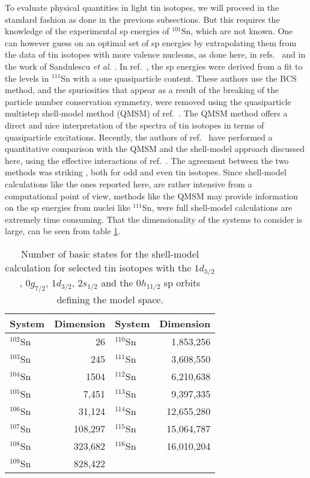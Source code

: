 To evaluate physical quantities in light tin isotopes, we will
proceed in the standard fashion as done in the previous
subsections. But this requires the knowledge of the
experimental sp energies of $^{101}$Sn, which are not known.
One can however guess on an optimal set of sp energies by
extrapolating them from the data of tin isotopes with more
valence nucleons, as done here, in refs.\ \cite{ehho93,holt94,physcripta94}
and in the work of
Sandulescu {\em et al.} \cite{nicu93,nicu94}.
In ref.\
\cite{nicu94},
the sp energies were derived from a fit to the levels in
$^{111}$Sn with a one quasiparticle content. These authors
use the BCS method, and the spuriosities that appear as a
result of the breaking of the particle number conservation symmetry,
were removed using the quasiparticle multistep shell-model method
(QMSM) of ref.\ \cite{pomar92}. The QMSM method offers a direct
and nice interpretation of the spectra of
tin isotopes in terms of quasiparticle excitations. Recently, 
the authors of ref.\ \cite{nicuoslo94}
have performed a quantitative comparison with the
QMSM and the shell-model approach discussed here, using the effective
interactions of ref.\ \cite{ehho93}. 
The agreement between the two methods was striking
\cite{nicuoslo94}, both for odd and even tin isotopes.
Since shell-model calculations like the ones reported here, are
rather intensive from a computational point of view,
methods like the QMSM may provide information on the sp energies
from nuclei like $^{111}$Sn, were full shell-model
calculations are extremely time consuming. That the dimensionality
of the systems to consider is large, can be seen from table
\ref{tab:tindim}.
\begin{table}
\label{tab:tindim}
\begin{center}
\caption{Number of basic states for the shell-model calculation
for selected tin isotopes with the 
$1d_{5/2}$, $0g_{7/2}$, $1d_{3/2}$, $2s_{1/2}$
and the $0h_{11/2}$ sp orbits defining the model space.}
\begin{tabular}{lr lr}\\ \hline
System & Dimension & System & Dimension\\ \hline
$^{102}$Sn  & 26&  $^{110}$Sn  & 1,853,256\\
$^{103}$Sn  & 245&  $^{111}$Sn  & 3,608,550\\
$^{104}$Sn  & 1504&  $^{112}$Sn  & 6,210,638\\
$^{105}$Sn  & 7,451&  $^{113}$Sn  & 9,397,335\\
$^{106}$Sn  & 31,124&  $^{114}$Sn  & 12,655,280\\
$^{107}$Sn  & 108,297&  $^{115}$Sn  & 15,064,787\\
$^{108}$Sn  & 323,682&  $^{116}$Sn  & 16,010,204 \\
$^{109}$Sn  & 828,422&              &           \\ \hline
\end{tabular}
\end{center}
\end{table}

